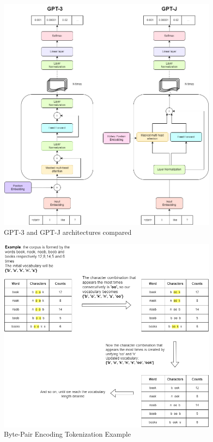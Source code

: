 \begin{figure}[h] 
    \includegraphics[width=\textwidth]{images/gptJ_vs_gpt_architecture.drawio.png}
    \caption{GPT-3 and GPT-J architectures compared}
    \label{fig:gpt-architectures}
\end{figure}    

\begin{figure}[h] 
    \includegraphics[width=\textwidth]{images/byte_pair.drawio.png}
    \caption{Byte-Pair Encoding Tokenization Example}
    \label{fig:Byte_Pair_Encoding}
\end{figure}    




